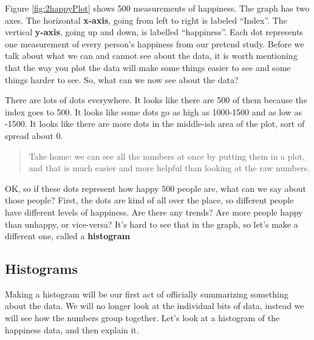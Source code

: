 \documentclass[
]{book}
\begin{document}
Figure \ref{fig:2happyPlot} shows 500 measurements of happiness. The graph has two axes. The horizontal \textbf{x-axis}, going from left to right is labeled ``Index''. The vertical \textbf{y-axis}, going up and down, is labelled ``happiness''. Each dot represents one measurement of every person's happiness from our pretend study. Before we talk about what we can and cannot see about the data, it is worth mentioning that the way you plot the data will make some things easier to see and some things harder to see. So, what can we now see about the data?

There are lots of dots everywhere. It looks like there are 500 of them because the index goes to 500. It looks like some dots go as high as 1000-1500 and as low as -1500. It looks like there are more dots in the middle-ish area of the plot, sort of spread about 0.

\begin{quote}
Take home: we can see all the numbers at once by putting them in a plot, and that is much easier and more helpful than looking at the raw numbers.
\end{quote}

OK, so if these dots represent how happy 500 people are, what can we say about those people? First, the dots are kind of all over the place, so different people have different levels of happiness. Are there any trends? Are more people happy than unhappy, or vice-versa? It's hard to see that in the graph, so let's make a different one, called a \textbf{histogram}

\subsection{Histograms}\label{histograms}

Making a histogram will be our first act of officially summarizing something about the data. We will no longer look at the individual bits of data, instead we will see how the numbers group together. Let's look at a histogram of the happiness data, and then explain it.
\end{document}
